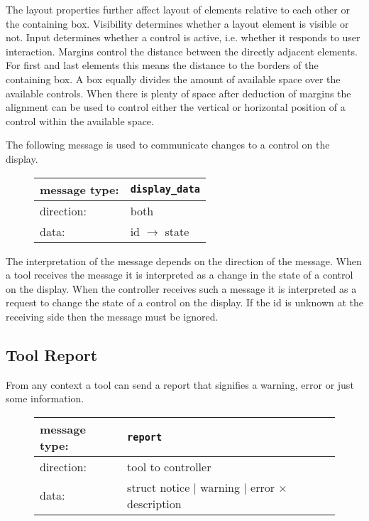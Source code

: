 \documentclass{article}
\newcommand{\msg}[1]{\texttt{#1}}
\begin{document}
   The layout properties further affect layout of elements relative to each
   other or the containing box. Visibility determines whether a layout element
   is visible or not. Input determines whether a control is active, i.e.
   whether it responds to user interaction. Margins control the distance
   between the directly adjacent elements. For first and last elements this
   means the distance to the borders of the containing box. A box equally
   divides the amount of available space over the available controls. When
   there is plenty of space after deduction of margins the alignment can be
   used to control either the vertical or horizontal position of a control
   within the available space.

   The following message is used to communicate changes to a control on the
   display.

   \begin{figure}[H]
    \begin{center}
     \begin{tabular}{|ll|}
      \hline
       message type:   & \msg{display\_data} \\
      \hline
       direction:      & both \\
       data:           & id $\rightarrow$ state \\
      \hline
     \end{tabular}
    \end{center}
   \end{figure}
   \vspace{-0.4cm}
   \noindent The interpretation of the message depends on the direction of the
   message. When a tool receives the message it is interpreted as a change in
   the state of a control on the display. When the controller receives such a
   message it is interpreted as a request to change the state of a control on
   the display. If the id is unknown at the receiving side then the message
   must be ignored.

  \subsection{Tool Report}

   From any context a tool can send a report that signifies a warning, error or
   just some information.

   \begin{figure}[H]
    \begin{center}
     \begin{tabular}{|ll|}
      \hline
       message type:   & \msg{report} \\
      \hline
       direction:      & tool to controller \\
       data:           & struct notice $|$ warning $|$ error $\times$ description \\
      \hline
     \end{tabular}
    \end{center}
   \end{figure}
\end{document}
